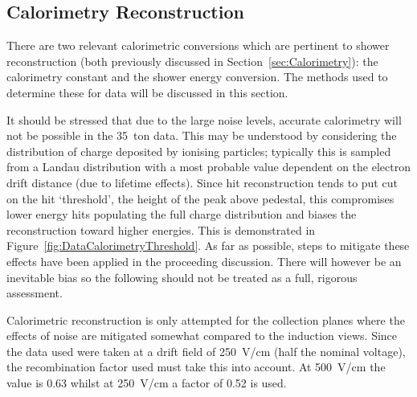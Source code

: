 \subsection{Calorimetry Reconstruction}\label{sec:DataCalorimetryReconstruction}

There are two relevant calorimetric conversions which are pertinent to shower reconstruction (both previously discussed in Section~\ref{sec:Calorimetry}): the calorimetry constant and the shower energy conversion.  The methods used to determine these for data will be discussed in this section.

It should be stressed that due to the large noise levels, accurate calorimetry will not be possible in the 35~ton data.  This may be understood by considering the distribution of charge deposited by ionising particles; typically this is sampled from a Landau distribution with a most probable value dependent on the electron drift distance (due to lifetime effects).  Since hit reconstruction tends to put cut on the hit `threshold', the height of the peak above pedestal, this compromises lower energy hits populating the full charge distribution and biases the reconstruction toward higher energies.  This is demonstrated in Figure~\ref{fig:DataCalorimetryThreshold}.  As far as possible, steps to mitigate these effects have been applied in the proceeding discussion.  There will however be an inevitable bias so the following should not be treated as a full, rigorous assessment.

Calorimetric reconstruction is only attempted for the collection planes where the effects of noise are mitigated somewhat compared to the induction views.  Since the data used were taken at a drift field of 250~V/cm (half the nominal voltage), the recombination factor used must take this into account.  At 500~V/cm the value is 0.63 whilst at 250~V/cm a factor of 0.52 is used.

